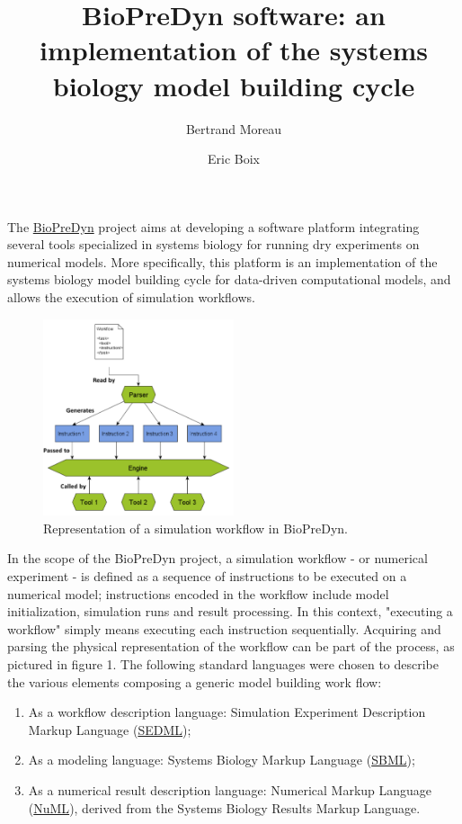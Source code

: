 \documentclass{llncs}
\begin{document}
\title{BioPreDyn software: an implementation of the systems biology model
building cycle}
\author{Bertrand Moreau \and Eric Boix}
\maketitle

The \href{http://www.biopredyn.eu/}{BioPreDyn} project aims at developing a
software platform integrating several tools specialized in systems biology for
running dry experiments on numerical models. More specifically, this platform
is an implementation of the systems biology model building cycle for data-driven
computational models\cite{Kitano2002}, and allows the execution of simulation
workflows.

\begin{figure}[!hbtp]
  \centering
  \includegraphics[width=0.5\textwidth]{proposal_complete}
  \caption{Representation of a simulation workflow in BioPreDyn.}
\end{figure}
In the scope of the BioPreDyn project, a simulation workflow - or
numerical experiment - is defined as a sequence of instructions to be executed
on a numerical model; instructions encoded in the workflow include model
initialization, simulation runs and result processing. In this context,
"executing a workflow" simply means executing each instruction sequentially.
Acquiring and parsing the physical representation of the workflow can be part
of the process, as pictured in figure 1. The following standard languages were
chosen to describe the various elements composing a generic model building work
flow:
\begin{enumerate}
\item As a workflow description language: Simulation Experiment Description
Markup Language (\href{http://sed-ml.org/}{SEDML});
\item As a modeling language: Systems Biology Markup Language
(\href{http://sbml.org}{SBML});
\item As a numerical result description language: Numerical Markup Language
(\href{http://code.google.com/p/numl/}{NuML}), derived from the Systems Biology
Results Markup Language.
\end{enumerate}
\end{document}
